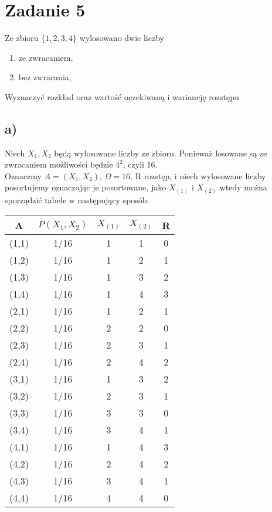 \documentclass{article}
\begin{document}
\newpage
\section{Zadanie 5}

Ze zbioru $\{1, 2, 3, 4\}$ wylosowano dwie liczby
\begin{enumerate}[label = \alph*)]
\item ze zwracaniem,
\item bez zwracania,
\end{enumerate}
Wyznaczyć rozkład oraz wartość oczekiwaną i wariancję rozstępu

\subsection*{a)}
Niech $X_1, X_2$ będą wylosowane liczby ze zbioru. Ponieważ losowane są ze zwracaniem możliwości będzie $4^2$, czyli 16. \\
Oznaczmy $A = (X_1,X_2)$, $\Omega = 16$, R rozstęp, i niech wylosowane liczby posortujemy oznaczając je posortowane, jako $X_{(1)}$ i $X_{(2)}$ wtedy można sporządzić tabele w następujący sposób:

\begin{center}
\begin{tabular}{|c|c|c|c|c|}
\hline
A & $P(X_1,X_2)$ & $X_{(1)}$ & $X_{(2)}$ & R\\
\hline
(1,1) & 1/16 & 1 & 1 & 0\\
\hline
(1,2) & 1/16 & 1 & 2 & 1\\
\hline
(1,3) & 1/16 & 1 & 3 & 2\\
\hline
(1,4) & 1/16 & 1 & 4 & 3\\
\hline
(2,1) & 1/16 & 1 & 2 & 1\\
\hline
(2,2) & 1/16 & 2 & 2 & 0\\
\hline
(2,3) & 1/16 & 2 & 3 & 1\\
\hline
(2,4) & 1/16 & 2 & 4 & 2\\
\hline
(3,1) & 1/16 & 1 & 3 & 2\\
\hline
(3,2) & 1/16 & 2 & 3 & 1\\
\hline
(3,3) & 1/16 & 3 & 3 & 0\\
\hline
(3,4) & 1/16 & 3 & 4 & 1\\
\hline
(4,1) & 1/16 & 1 & 4 & 3\\
\hline
(4,2) & 1/16 & 2 & 4 & 2\\
\hline
(4,3) & 1/16 & 3 & 4 & 1\\
\hline
(4,4) & 1/16 & 4 & 4 & 0\\
\hline
\end{tabular}
\end{center}
\end{document}
